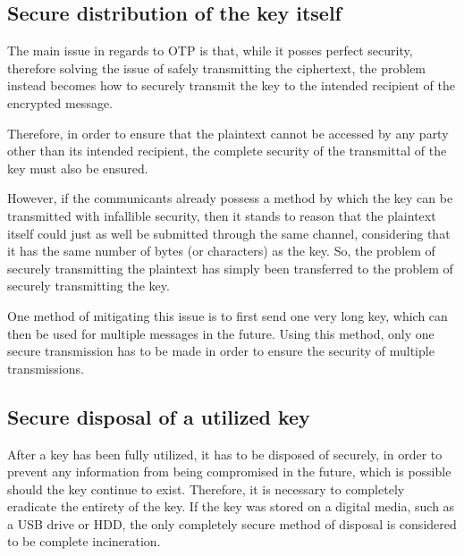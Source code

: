 \documentclass[12pt]{report}
\begin{document}
\subsection{Secure distribution of the key itself}
The main issue in regards to OTP is that, while it posses perfect security, therefore solving the issue of safely transmitting the ciphertext, the problem instead becomes how to securely transmit the key to the intended recipient of the encrypted message.

Therefore, in order to ensure that the plaintext cannot be accessed by any party other than its intended recipient, the complete security of the transmittal of the key must also be ensured.

However, if the communicants already possess a method by which the key can be transmitted with infallible security, then it stands to reason that the plaintext itself could just as well be submitted through the same channel, considering that it has the same number of bytes (or characters) as the key. So, the problem of securely transmitting the plaintext has simply been transferred to the problem of securely transmitting the key.




One method of mitigating this issue is to first send one very long key, which can then be used for multiple messages in the future. Using this method, only one secure transmission has to be made in order to ensure the security of multiple transmissions. 

\subsection{Secure disposal of a utilized key}
After a key has been fully utilized, it has to be disposed of securely, in order to prevent any information from being compromised in the future, which is possible should the key continue to exist. Therefore, it is necessary to completely eradicate the entirety of the key. If the key was stored on a digital media, such as a USB drive or HDD, the only completely secure method of disposal is considered to be complete incineration.

\end{document}
